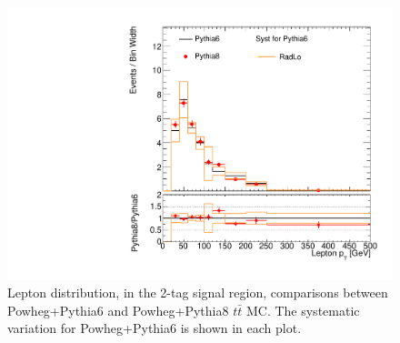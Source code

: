 \begin{figure}[!h]
\begin{center}
\includegraphics[scale=0.33]{./figures/boosted/TTBarPy6VsPy8/TTBarPy6VsPy8_SR_LepPt_radlo}
\caption{Lepton \pt distribution, in the 2-tag signal region, comparisons between Powheg+Pythia6 and Powheg+Pythia8 $t\bar{t}$ MC. 
The systematic variation for Powheg+Pythia6 is shown in each plot.}
\label{fig:boosted_ttbarpy6py8_LepPt}
\end{center}
\end{figure}


